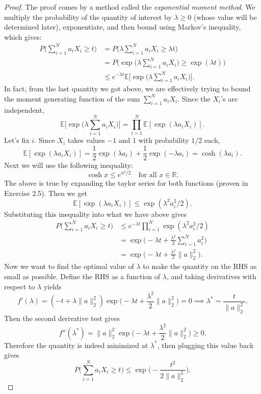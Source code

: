 \begin{proof}
The proof comes by a method called the \textit{exponential moment method}. We multiply the probability of 
the quantity of interest by $\lambda \geq 0$ (whose value will be determined later), exponentiate, 
and then bound using Markov's inequality, which gives: 
\begin{align*}
	P \biggl( \sum_{i = 1}^{N} a_iX_i \geq t \biggr) 
	&= P \biggl( \lambda \sum_{i = 1}^{N} a_iX_i \geq \lambda t \biggr) \\
	&= P \biggl( \exp{\biggl( \lambda \sum_{i = 1}^{N} a_iX_i \biggr)} \geq \exp{(\lambda t)} \biggr) \\
	&\leq e^{-\lambda t} \mathbb{E} \biggl[ \exp{\biggl( \lambda \sum_{i = 1}^{N} a_iX_i \biggr)} \biggr].
\end{align*}
In fact, from the last quantity we got above, we are effectively trying to bound the moment generating 
function of the sum $\sum_{i = 1}^{N} a_iX_i$. Since the $X_i$'s are independent, 
\[ \mathbb{E} \biggl[ \exp{\biggl( \lambda \sum_{i = 1}^{N} a_iX_i \biggr)} \biggr] 
= \prod_{i = 1}^{N} \mathbb{E}[\exp{(\lambda a_i X_i)}]. \]
Let's fix $i$. Since $X_i$ takes values $-1$ and $1$ with probability $1/2$ each, 
\[ \mathbb{E}[\exp{(\lambda a_i X_i)}] = \frac{1}{2}\exp{(\lambda a_i)} 
+ \frac{1}{2}\exp{(-\lambda a_i)} = \cosh{(\lambda a_i)}. \]
Next we will use the following inequality: 
\[ \cosh{x} \leq e^{x^2/2} \quad \text{for all } x \in \mathbb{R}. \]
The above is true by expanding the taylor series for both functions (proven in Exercise 2.5). Then 
we get 
\[ \mathbb{E}[\exp{(\lambda a_i X_i)}] \leq \exp{(\lambda^2 a_i^2 / 2)}. \]
Substituting this inequality into what we have above gives 
\begin{align*}
	P \biggl( \sum_{i = 1}^{N} a_iX_i \geq t \biggr) 
	&\leq e^{-\lambda t} \prod_{i = 1}^{N} \exp{(\lambda^2 a_i^2 / 2)} \\
	&= \exp{\biggl( -\lambda t + \frac{\lambda^2}{2}\sum_{i = 1}^{N} a_i^2 \biggr)} \\
	&= \exp{\biggl( -\lambda t + \frac{\lambda^2}{2} \|a\|_2^2 \biggr)}.
\end{align*}
Now we want to find the optimal value of $\lambda$ to make the quantity on the RHS as small as possible. 
Define the RHS as a function of $\lambda$,  and taking derivatives with respect to $\lambda$ yields
\[ f'(\lambda) = (-t + \lambda \|a\|_2^2) 
\exp{\biggl( -\lambda t + \frac{\lambda^2}{2} \|a\|_2^2 \biggr)} = 0 
\implies \lambda^* = \frac{t}{\|a\|_2^2}. \]
Then the second derivative test gives 
\[ f''(\lambda^*) = \|a\|_2^2 \exp{\biggl( -\lambda t + \frac{\lambda^2}{2} \|a\|_2^2 \biggr)} \geq 0. \]
Therefore the quantity is indeed minimized at $\lambda^*$, then plugging this value back gives 
\[ P \biggl( \sum_{i = 1}^{N} a_iX_i \geq t \biggr) 
\leq \exp{\biggl( -\frac{t^2}{2\|a\|_2^2} \biggr)}. \]


\end{proof}
